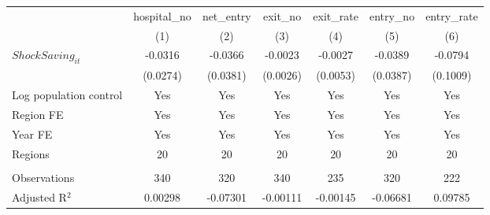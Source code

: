 \begingroup
\centering
\begin{tabular}{lcccccc}
   \toprule
                          & hospital\_no  & net\_entry  & exit\_no  & exit\_rate  & entry\_no  & entry\_rate \\    
                          & (1)           & (2)         & (3)       & (4)         & (5)        & (6)\\  
   \midrule 
   $ShockSaving_{it}$     & -0.0316       & -0.0366     & -0.0023   & -0.0027     & -0.0389    & -0.0794\\   
                          & (0.0274)      & (0.0381)    & (0.0026)  & (0.0053)    & (0.0387)   & (0.1009)\\   
   Log population control & Yes           & Yes         & Yes       & Yes         & Yes        & Yes\\  
   Region FE              & Yes           & Yes         & Yes       & Yes         & Yes        & Yes\\  
   Year FE                & Yes           & Yes         & Yes       & Yes         & Yes        & Yes\\  
   Regions                & 20            & 20          & 20        & 20          & 20         & 20\\  
    \\
   Observations           & 340           & 320         & 340       & 235         & 320        & 222\\  
   Adjusted R$^2$         & 0.00298       & -0.07301    & -0.00111  & -0.00145    & -0.06681   & 0.09785\\  
   \bottomrule
\end{tabular}
\par\endgroup
